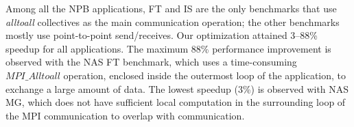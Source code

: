 Among all the NPB applications, FT and IS are the only benchmarks that use {\em alltoall} collectives as the main communication operation; the other benchmarks mostly use point-to-point send/receives.
Our optimization attained 3--88\% speedup for all applications.
The maximum 88\% performance improvement is observed with the NAS FT benchmark, which uses a time-consuming $MPI\_Alltoall$ operation, enclosed inside the outermost loop of the application,  to exchange a large amount of data.
The lowest speedup (3\%) is observed with NAS MG, which does not have sufficient local computation in the surrounding loop of the MPI communication to overlap with communication. 




